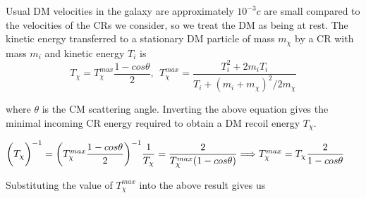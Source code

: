 \documentclass[fleqn]{article}
\begin{document}
Usual DM velocities in the galaxy are approximately $10^{-3} c$ are small compared to the velocities of 
the CRs we consider, so we treat the DM as being at rest. The kinetic energy transferred
to a stationary DM particle of mass $m_{\chi}$ by a CR with mass $m_i$ and kinetic energy $T_i$ is
$$
  T_{\chi}=T^{max}_{\chi} \dfrac{1- cos \theta}{2}, ~~ T^{max}_{\chi}=\dfrac{T^2_i+2 m_i T_i}{T_i+(m_i+m_{\chi})^2/ 2 m_{\chi}}
$$

where $\theta$ is the CM scattering angle. Inverting the above equation gives the minimal incoming CR energy 
required to obtain a DM recoil energy $T_{\chi}$.

\vspace{10px}

$
  \\
  \bigg( T_{\chi} \bigg)^{-1}=\bigg( T^{max}_{\chi} \dfrac{1- cos \theta}{2} \bigg)^{-1} 
  \\
  \\
  \\
  \dfrac{1}{T_{\chi}}=\dfrac{2}{T^{max}_{\chi}(1-cos \theta)}
  \Longrightarrow T^{max}_{\chi}=T_{\chi} \dfrac{2}{1-cos \theta}
  \\
  \\
$

Substituting the value of $T^{max}_{\chi}$ into the above result gives us
\end{document}
